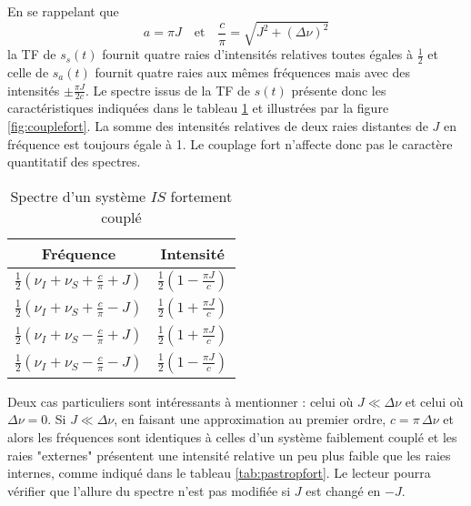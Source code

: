 En se rappelant que
\begin{equation}
a = \pi J \quad\mbox{et}\quad \frac{c}{\pi}=\sqrt{J^2+(\Delta \nu)^2}
\end{equation}
la TF de $s_s(t)$ fournit quatre raies d'intensités
relatives toutes égales à $\frac{1}{2}$ et celle de $s_a(t)$ fournit
quatre raies aux mêmes fréquences mais avec des intensités $\pm\frac{\pi J}{2c}$.
Le spectre issus de la TF de $s(t)$ présente donc les caractéristiques indiquées
dans le tableau \ref{tab:couplefort} et illustrées par la figure
\ref{fig:couplefort}.
La somme des intensités relatives 
de deux raies distantes de $J$ en fréquence
est toujours égale à 1.
Le couplage fort n'affecte donc pas le caractère quantitatif des spectres.

\begin{table}[hbt]
\caption{Spectre d'un système $IS$ fortement couplé}
\label{tab:couplefort}
\begin{center}
\begin{tabular}{cc}
\hline
Fréquence & Intensité \\ \hline
$\frac{1}{2}\left(\nu_I + \nu_S + \frac{c}{\pi} + J \right)$ & 
$\frac{1}{2}\left(1 - \frac{\pi J}{c} \right)$ \\
$\frac{1}{2}\left(\nu_I + \nu_S + \frac{c}{\pi} - J \right)$ & 
$\frac{1}{2}\left(1 + \frac{\pi J}{c} \right)$ \\
$\frac{1}{2}\left(\nu_I + \nu_S - \frac{c}{\pi} + J \right)$ & 
$\frac{1}{2}\left(1 + \frac{\pi J}{c} \right)$ \\
$\frac{1}{2}\left(\nu_I + \nu_S - \frac{c}{\pi} - J \right)$ & 
$\frac{1}{2}\left(1 - \frac{\pi J}{c} \right)$ \\
\hline
\end{tabular}
\end{center}
\end{table}

Deux cas particuliers sont intéressants à mentionner : celui où $J \ll \Delta\nu$
et celui où $\Delta\nu = 0$.
Si $J \ll \Delta\nu$, en faisant une approximation au premier ordre,
$c = \pi \, \Delta\nu$ et alors les fréquences sont identiques à celles d'un système
faiblement couplé et les raies "externes" présentent une intensité relative
un peu plus faible que les raies internes, comme indiqué dans le
tableau \ref{tab:pastropfort}.
Le lecteur pourra vérifier que l'allure du spectre n'est pas modifiée si
$J$ est changé en $-J$.

